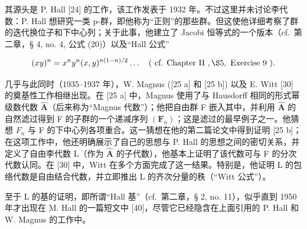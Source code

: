 其源头是 P. Hall {[}24{]} 的工作，该工作发表于 1932 年。不过这里并未讨论李代数：P. Hall 想研究一类 p-群，即他称为“正则”的那些群。但这使他详细考察了群的迭代换位子和下中心列；关于此事，他建立了 Jacobi 恒等式的一个版本（cf.~第二章，§ 4, no. 4, 公式 (20)）以及“Hall 公式”

\[
(x y) ^ {n} = x ^ {n} y ^ {n} (x, y) ^ {n (1 - n) / 2} \dots \quad (\text { cf.   Chapter   II }, \S 5, \text { Exercise   9 }).
\]

几乎与此同时（1935--1937 年），W. Magnus ({[}25 a{]} 和 {[}25 b{]}) 以及 E. Witt {[}30{]} 的奠基性工作相继出现。在 {[}25 a{]} 中，Magnus 使用了与 Hausdorff 相同的形式幂级数代数 \(\hat{\mathbf{A}}\)（后来称为“Magnus 代数”）；他把自由群 F 嵌入其中，并利用 \(\hat{\mathbf{A}}\) 的自然滤过得到 F 的子群的一个递减序列 \((\mathbf{F}_{n})\)；这是滤过的最早例子之一。他猜想 \(F_{n}\) 与 F 的下中心列各项重合。这一猜想在他的第二篇论文中得到证明 {[}25 b{]}；在这项工作中，他还明确展示了自己的思想与 P. Hall 的思想之间的密切关系，并定义了自由李代数 L（作为 \(\hat{\mathbf{A}}\) 的子代数），他基本上证明了该代数可与 F 的分次代数认同。在 {[}30{]} 中，Witt 在多个方面完成了这一结果。特别是，他证明 L 的包络代数是自由结合代数，并立即推出 L 的齐次分量的秩（“Witt 公式”）。

至于 L 的基的证明，即所谓“Hall 基”（cf.~第二章，§ 2, no. 11），似乎直到 1950 年才出现在 M. Hall 的一篇短文中 {[}40{]}，尽管它已经隐含在上面引用的 P. Hall 和 W. Magnus 的工作中。


